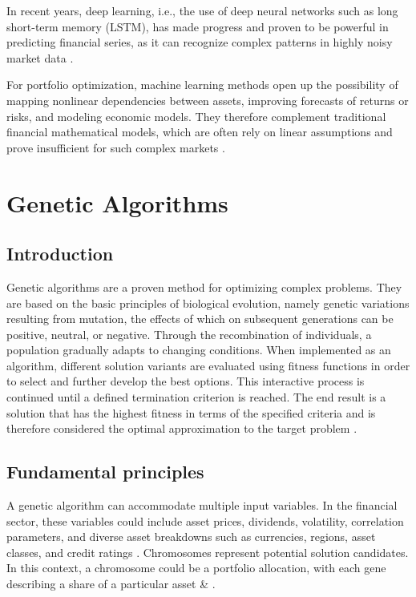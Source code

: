 \documentclass{agasthesis}
\begin{document}
In recent years, deep learning, i.e., the use of deep neural networks such as long short-term memory (LSTM), 
has made progress and proven to be powerful in predicting financial series, as it can recognize complex patterns in highly noisy market data \cite{fischer_deep_2018}.

For portfolio optimization, machine learning methods open up the possibility of mapping nonlinear dependencies between assets, 
improving forecasts of returns or risks, and modeling economic models. They therefore complement traditional financial mathematical models, 
which are often rely on linear assumptions and prove insufficient for such complex markets \cite{gu_empirical_2020}.

\section{Genetic Algorithms}
\subsection{Introduction}
Genetic algorithms are a proven method for optimizing complex problems. They are based on the basic principles of biological evolution, 
namely genetic variations resulting from mutation, the effects of which on subsequent generations can be positive, neutral, or negative. 
Through the recombination of individuals, a population gradually adapts to changing conditions. When implemented as an algorithm, 
different solution variants are evaluated using fitness functions in order to select and further develop the best options. 
This interactive process is continued until a defined termination criterion is reached. 
The end result is a solution that has the highest fitness in terms of the specified criteria and is therefore considered the optimal approximation to the target problem \cite[p. 203]{soldatos_big_2022}.
\subsection{Fundamental principles}
A genetic algorithm can accommodate multiple input variables. In the financial sector, these variables could include asset prices, dividends, volatility, 
correlation parameters, and diverse asset breakdowns such as currencies, regions, asset classes, and credit ratings \cite[p. 204]{soldatos_big_2022}. 
Chromosomes represent potential solution candidates. In this context, a chromosome could be a portfolio allocation, 
with each gene describing a share of a particular asset \cite[p. 204]{soldatos_big_2022} & \cite[p. 7]{melanie_introduction_1999}. 
\end{document}
